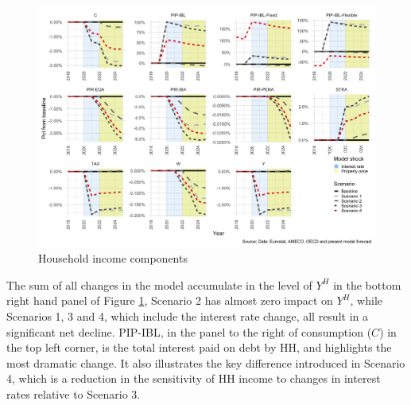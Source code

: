 \documentclass[
]{book}
\begin{document}
\begin{figure}[H]
\includegraphics[width=0.95\linewidth]{figures/fl-fi-sfc-plot-hh-indicators-y-1} \caption{Household income components}\label{fig:fl-fi-sfc-plot-hh-indicators-y}
\end{figure}

The sum of all changes in the model accumulate in the level of \(Y^H\) in the bottom right hand panel of Figure \ref{fig:fl-fi-sfc-plot-hh-indicators-y}, Scenario 2 has almost zero impact on \(Y^H\), while Scenarios 1, 3 and 4, which include the interest rate change, all result in a significant net decline. PIP-IBL, in the panel to the right of consumption (\(C\)) in the top left corner, is the total interest paid on debt by HH, and highlights the most dramatic change. It also illustrates the key difference introduced in Scenario 4, which is a reduction in the sensitivity of HH income to changes in interest rates relative to Scenario 3.
\end{document}
